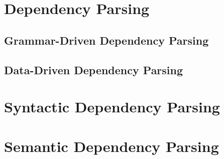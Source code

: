 \section{Dependency Parsing}
\subsection{Grammar-Driven Dependency Parsing}
\subsection{Data-Driven Dependency Parsing}


\section{Syntactic Dependency Parsing}


\section{Semantic Dependency Parsing}





